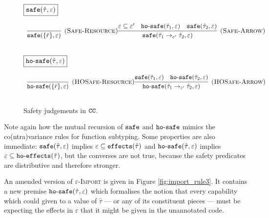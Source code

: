 \begin{figure}[h]

\noindent
$\fbox{$\mathtt{safe}(\hat \tau, \varepsilon)$}$

\[
\begin{array}{c}

\infer[\textsc{(Safe-Resource)}]
	{ \kwa{safe}(\{ \bar r \}, \varepsilon) }
	{} 
	
\infer[\textsc{(Safe-Arrow)}]
	{\kwa{safe}(\hat \tau_1 \rightarrow_{\varepsilon'} \hat \tau_2, \varepsilon)}
	{\varepsilon \subseteq \varepsilon' & \kwa{ho \hyphen safe}(\hat \tau_1, \varepsilon) & \kwa{safe}(\hat \tau_2, \varepsilon)} \\[3ex]

\end{array}
\]

\noindent
$\fbox{$\mathtt{ho \hbox{-} safe}(\hat \tau, \varepsilon)$}$

\[
\begin{array}{c}

\infer[\textsc{(HOSafe-Resource)}]
	{ \kwa{ho \hyphen safe}( \{ \bar r \}, \varepsilon)} 
	{}

\infer[\textsc{(HOSafe-Arrow)}]
	{ \kwa{ho \hyphen safe}( \hat \tau_1 \rightarrow_{\varepsilon'} \hat \tau_2, \varepsilon ) }
	{ \kwa{safe}(\hat \tau_1, \varepsilon)  & \kwa{ho \hyphen safe}(\hat \tau_2, \varepsilon) }\\[3ex]

\end{array}
\]

\vspace{-7pt}
\caption{Safety judgements in $\mathtt{CC}$.}
\label{fig:safe_defns}
\end{figure}

Note again how the mutual recursion of $\mathtt{safe}$ and $\mathtt{ho \hbox{-} safe}$ mimics the co(ntra)variance rules for function subtyping. Some properties are also immediate: $\mathtt{safe}(\hat \tau, \varepsilon)$ implies $\varepsilon \subseteq \mathtt{effects}(\hat \tau)$ and $\mathtt{ho \hbox{-} safe}(\hat \tau, \varepsilon)$ implies $\varepsilon \subseteq \mathtt{ho \hbox{-} effects}(\hat \tau)$, but the converses are not true, because the safety predicates are distributive and therefore stronger.

An amended version of \textsc{$\varepsilon$-Import} is given in Figure \ref{fig:import_rule3}. It contains a new premise $\mathtt{ho \hbox{-} safe}(\hat \tau, \varepsilon)$ which formalises the notion that every capability which could given to a value of $\hat \tau$ --- or any of its constituent pieces --- must be expecting the effects in $\varepsilon$ that it might be given in the unannotated code.

